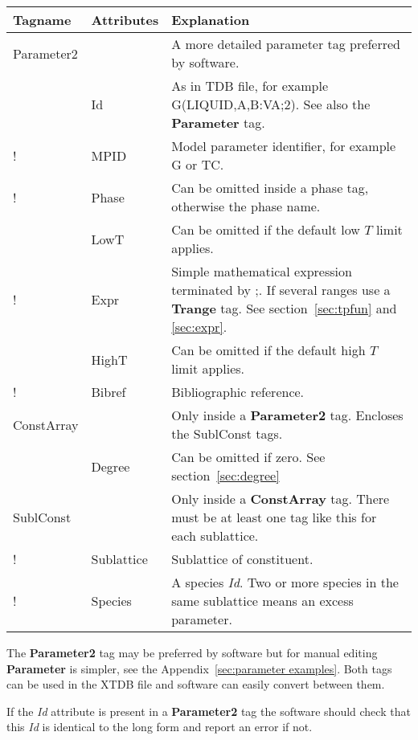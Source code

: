\documentclass{article}
\begin{document}
\bigskip
\begin{tabular}{|p{} p{} p{}|}\hline
  Tagname& Attributes &  Explanation\\\hline

  Parameter2 & & A more detailed parameter tag preferred by software.\\
      & Id & As in TDB file, for example G(LIQUID,A,B:VA;2).  See also the {\bf Parameter} tag. \\
!      & MPID & Model parameter identifier, for example G or TC.\\
!      & Phase &  Can be omitted inside a phase tag, otherwise the phase name.\\
      & LowT & Can be omitted if the default low $T$ limit applies.\\
!      & Expr & Simple mathematical expression terminated by ;.  If several ranges use a {\bf Trange} tag.  See section~\ref{sec:tpfun} and \ref{sec:expr}.\\
      & HighT & Can be omitted if the default high $T$ limit applies.\\
!      & Bibref & Bibliographic reference.\\\hline

  ConstArray & & Only inside a {\bf Parameter2} tag.  Encloses the
                   SublConst tags.\\
      & Degree & Can be omitted if zero.  See section~\ref{sec:degree}\\\hline
  
  SublConst & & Only inside a {\bf ConstArray} tag. There must be at least
              one tag like this for each sublattice.\\
!      & Sublattice &  Sublattice of constituent.\\
!      & Species & A species {\em Id}.  Two or more species in the same 
             sublattice means an excess parameter.\\\hline  
\end{tabular}

\bigskip
The {\bf Parameter2} tag may be preferred by software but for
manual editing {\bf Parameter} is simpler, see the
Appendix~\ref{sec:parameter examples}.  Both tags can be used in
the XTDB file and software can easily convert between them.

If the {\em Id} attribute is present in a {\bf Parameter2} tag the
software should check that this {\em Id} is identical to the long form
and report an error if not.
\end{document}
